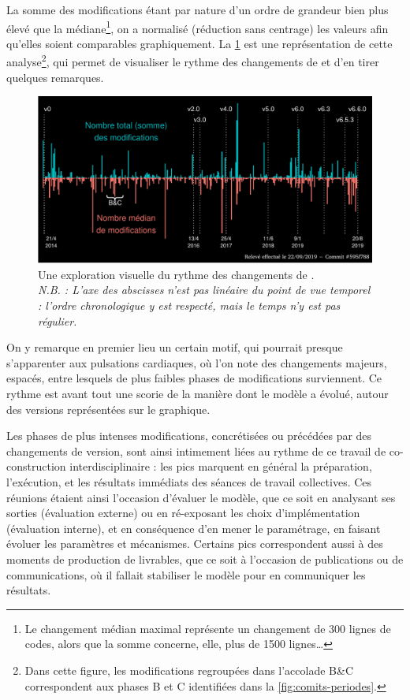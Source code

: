 La somme des modifications étant par nature d'un ordre de grandeur bien plus élevé que la médiane\footnote{
	Le changement médian maximal représente un changement de 300 lignes de codes, alors que la somme concerne, elle, plus de 1500 lignes\ldots
}, on a normalisé (réduction sans centrage) les valeurs afin qu'elles soient comparables graphiquement.
La \cref{fig:explo-edits-code} est une représentation de cette analyse\footnote{
	Dans cette figure, les modifications regroupées dans l'accolade \og B\&C\fg{} correspondent aux phases B et C identifiées dans la  \cref{fig:comits-periodes}.
}, qui permet de visualiser le \og rythme\fg{} des changements de \simfeodal{} et d'en tirer quelques remarques.


\begin{figure}[H]
	\includegraphics[width=1\linewidth]{img/explo_edits_code_clean.pdf}
	\caption[Une exploration visuelle du rythme des changements de \simfeodal{}.]{Une exploration visuelle du rythme des changements de \simfeodal{}.\\
		\textit{N.B. : L'axe des abscisses n'est pas linéaire du point de vue temporel : l'ordre chronologique y est respecté, mais le temps n'y est pas régulier.}
	}
	\label{fig:explo-edits-code}
\end{figure}

On y remarque en premier lieu un certain motif, qui pourrait presque s'apparenter aux pulsations cardiaques, où l'on note des changements majeurs, espacés, entre lesquels de plus faibles phases de modifications surviennent.
Ce \og rythme\fg{} est avant tout une scorie de la manière dont le modèle a évolué, autour des versions représentées sur le graphique.

Les phases de plus intenses modifications, concrétisées ou précédées par des changements de version, sont ainsi intimement liées au rythme de ce travail de co-construction interdisciplinaire : les pics marquent en général la préparation, l'exécution, et les résultats immédiats des séances de travail collectives.
Ces réunions étaient ainsi l'occasion d'évaluer le modèle, que ce soit en analysant ses sorties (évaluation externe) ou en ré-exposant les choix d'implémentation (évaluation interne), et en conséquence d'en mener le paramétrage, en faisant évoluer les paramètres et mécanismes.
Certains pics correspondent aussi à des moments de production de \og livrables\fg{}, que ce soit à l'occasion de publications ou de communications, où il fallait stabiliser le modèle pour en communiquer les résultats.

